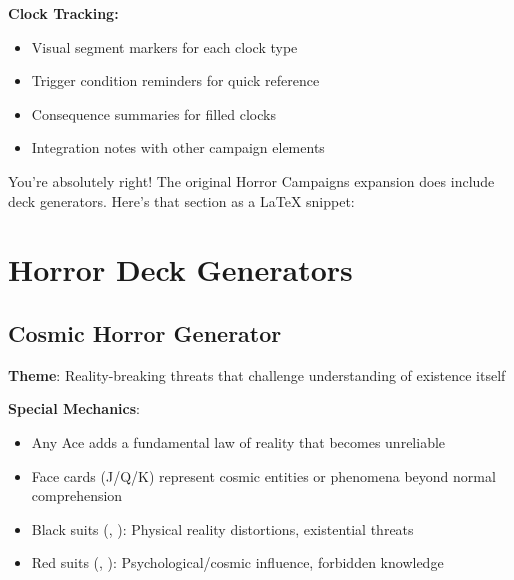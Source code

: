 \documentclass[11pt]{article}
\begin{document}
\textbf{Clock Tracking:}
\begin{itemize}
\item Visual segment markers for each clock type
\item Trigger condition reminders for quick reference
\item Consequence summaries for filled clocks
\item Integration notes with other campaign elements
\end{itemize}

You're absolutely right! The original Horror Campaigns expansion does include deck generators. Here's that section as a LaTeX snippet:

\section{Horror Deck Generators}

\subsection{Cosmic Horror Generator}

\begin{mdframed}[backgroundcolor=shadecolor]
\textbf{Theme}: Reality-breaking threats that challenge understanding of existence itself

\textbf{Special Mechanics}:
\begin{itemize}[leftmargin=*]
\item Any Ace adds a fundamental law of reality that becomes unreliable
\item Face cards (J/Q/K) represent cosmic entities or phenomena beyond normal comprehension
\item Black suits (\spadesuit, \clubsuit): Physical reality distortions, existential threats
\item Red suits (\heartsuit, \diamondsuit): Psychological/cosmic influence, forbidden knowledge
\end{itemize}
\end{mdframed}
\end{document}

